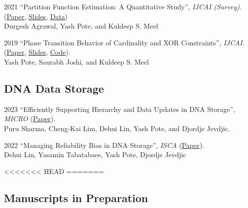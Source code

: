 \documentclass[12pt,letterpaper]{report}
\begin{document}
\begin{tablist}
	
	\item[2021] \tab  \enquote{Partition Function Estimation: A Quantitative Study},  \textit{IJCAI (Survey)}.\\
(\href{https://arxiv.org/abs/2105.11132}{Paper}, \href{https://meelgroup.github.io/publication/ijcai21_partition}{Slides}, \href{https://doi.org/10.5281/zenodo.4769117}{Data})\\
Durgesh Agrawal, Yash Pote, and Kuldeep S. Meel

		\item[2019] \tab \enquote{Phase Transition Behavior of Cardinality and
	XOR Constraints}, \textit{IJCAI}.\\ (\href{https://arxiv.org/abs/1910.09755}{Paper},  \href{https://meelgroup.github.io/files/slides/ijcai19pjm.pdf}{Slides},  \href{https://github.com/meelgroup/1-CARD-XOR/}{Code}).\\
Yash Pote, Saurabh Joshi, and Kuldeep S. Meel

\end{tablist}
	\subsection*{DNA Data Storage}
	\begin{tablist}
	
		\item[2023] \tab  \enquote{Efficiently Supporting Hierarchy and Data Updates in DNA Storage}, \textit{MICRO} (\href{https://arxiv.org/abs/2212.13447}{Paper}).\\
	Puru Sharma, Cheng-Kai Lim, Dehui Lin, Yash Pote, and Djordje Jevdjic.
	
		\item[2022] \tab  \enquote{Managing Reliability Bias in DNA Storage}, \textit{ISCA}  (\href{https://arxiv.org/abs/2204.12261}{Paper}).\\
	Dehui Lin, Yasamin Tabatabaee, Yash Pote, Djordje Jevdjic
	
\end{tablist}
	
<<<<<<< HEAD
=======
\subsection*{Manuscripts in Preparation}
	
\end{document}
